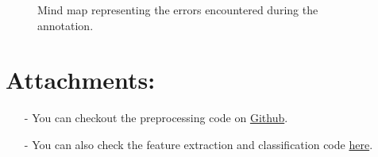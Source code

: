 \documentclass[a4paper, 11pt]{article}
\begin{document}
	\begin{landscape}
		\begin{figure}[]
			
			\caption{\label{fig::mindmap_errors} Mind map representing the errors encountered during the annotation.}
		\end{figure}
	\end{landscape}

\section*{Attachments:}

\begin{itemize}
	\item[-] You can checkout the preprocessing code on
	\href{https://github.com/ethiy/proj.city}{Github}.
	\item[-] You can also check the feature extraction and classification code
	\href{https://github.com/ethiy/qualcity}{here}.
\end{itemize}
\end{document}
